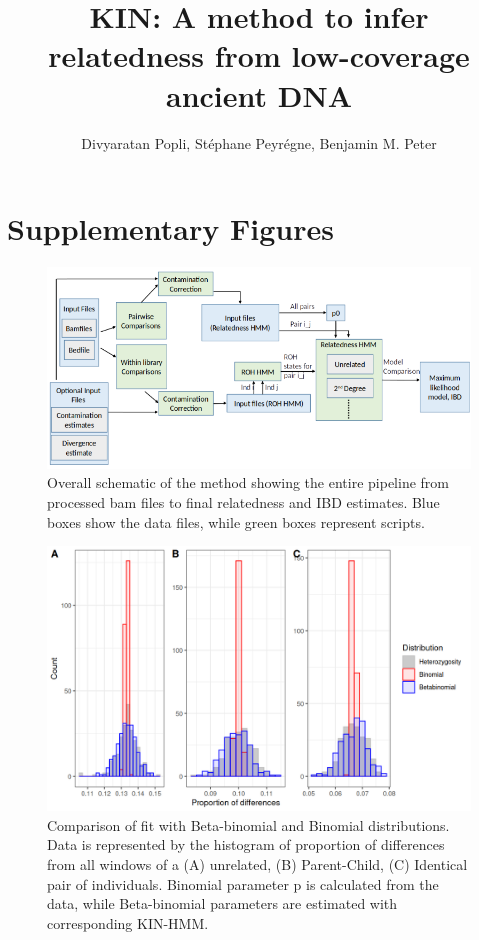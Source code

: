 \documentclass[12pt, letterpaper]{article}
\title{KIN: A method to infer relatedness from low-coverage ancient DNA}
\author{Divyaratan Popli, Stéphane Peyrégne, Benjamin M. Peter}
\begin{document}
\maketitle
\section*{Supplementary Figures}


\renewcommand{\figurename}{Fig. S}
\begin{figure}[h!]
    \includegraphics[width=18cm]{plots/inkscape_finalImg/schematic1.png}
    \centering
    \caption{Overall schematic of the method showing the entire pipeline from processed bam files to final relatedness and IBD estimates. Blue boxes show the data files, while green boxes represent scripts.}
    \label{figS0:schematic}
\end{figure}




\begin{figure}[h!]
    \includegraphics[width=18cm]{supplementary_info/plots/binom.png}
    \centering
    \caption{Comparison of fit with Beta-binomial and Binomial distributions. Data is represented by the histogram of proportion of differences from all windows of a (A) unrelated, (B) Parent-Child, (C) Identical pair of individuals. Binomial parameter p is calculated from the data, while Beta-binomial parameters are estimated with corresponding KIN-HMM.}
    \label{figS1:binom}
    
\end{figure}
\end{document}
